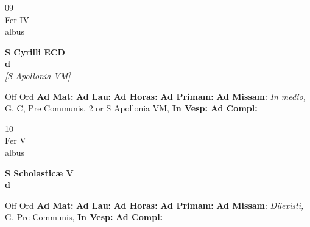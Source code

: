 \documentclass[10pt, openany]{book}
\begin{document}
    \begin{center}
        \begin{minipage}{3.5in}
            \vspace{2em}
            \begin{minipage}{0.5in}
                {\Huge 09} \\
                {\normalsize Fer IV} \\
                {\normalsize albus}
            \end{minipage}
            \begin{minipage}{3.0in}
                \textbf{ \large S Cyrilli ECD \\
                \textnormal{\normalsize d}} \\ \textit{[S Apollonia VM]} \\ 
            \end{minipage}
            \begin{justify}Off Ord
                \textbf{Ad Mat: }
                \textbf{Ad Lau: }
                \textbf{Ad Horas: }
                \textbf{Ad Primam: }\textbf{Ad Missam}: \textit{In medio,} G, C, Pre Communis, 2 or S Apollonia VM,  
                \textbf{In Vesp: }
                \textbf{Ad Compl: }
            \end{justify}
        \end{minipage}
    \end{center}

    \begin{center}
        \begin{minipage}{3.5in}
            \vspace{2em}
            \begin{minipage}{0.5in}
                {\Huge 10} \\
                {\normalsize Fer V} \\
                {\normalsize albus}
            \end{minipage}
            \begin{minipage}{3.0in}
                \textbf{ \large S Scholasticæ V \\
                \textnormal{\normalsize d}} \\ 
            \end{minipage}
            \begin{justify}Off Ord
                \textbf{Ad Mat: }
                \textbf{Ad Lau: }
                \textbf{Ad Horas: }
                \textbf{Ad Primam: }\textbf{Ad Missam}: \textit{Dilexisti,} G, Pre Communis,  
                \textbf{In Vesp: }
                \textbf{Ad Compl: }
            \end{justify}
        \end{minipage}
    \end{center}
\end{document}
